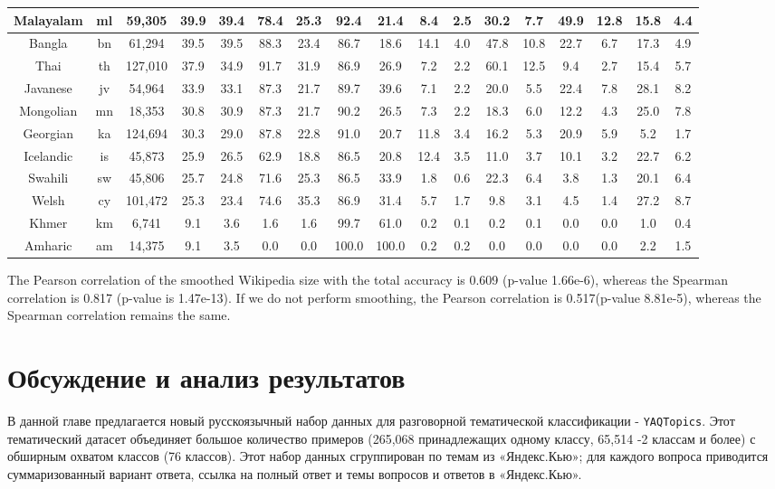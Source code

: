 \begin{table*}
{\begin{tabular}{|c|c|c||c|c|c|c|c|c|c|c|c|c|c|c|c|c|}
Malayalam & ml & 59,305 & 39.9 & 39.4 & 78.4 & 25.3 & 92.4 & 21.4 & 8.4 & 2.5 & 30.2 & 7.7 & 49.9 & 12.8 & 15.8 & 4.4\\ \hline
Bangla & bn & 61,294 & 39.5 & 39.5 & 88.3 & 23.4 & 86.7 & 18.6 & 14.1 & 4.0 & 47.8 & 10.8 & 22.7 & 6.7 & 17.3 & 4.9\\ \hline
Thai & th & 127,010 & 37.9 & 34.9 & 91.7 & 31.9 & 86.9 & 26.9 & 7.2 & 2.2 & 60.1 & 12.5 & 9.4 & 2.7 & 15.4 & 5.7\\ \hline
Javanese & jv & 54,964 & 33.9 & 33.1 & 87.3 & 21.7 & 89.7 & 39.6 & 7.1 & 2.2 & 20.0 & 5.5 & 22.4 & 7.8 & 28.1 & 8.2\\ \hline
Mongolian & mn & 18,353 & 30.8 & 30.9 & 87.3 & 21.7 & 90.2 & 26.5 & 7.3 & 2.2 & 18.3 & 6.0 & 12.2 & 4.3 & 25.0 & 7.8\\ \hline
Georgian & ka & 124,694 & 30.3 & 29.0 & 87.8 & 22.8 & 91.0 & 20.7 & 11.8 & 3.4 & 16.2 & 5.3 & 20.9 & 5.9 & 5.2 & 1.7\\ \hline
Icelandic & is & 45,873 & 25.9 & 26.5 & 62.9 & 18.8 & 86.5 & 20.8 & 12.4 & 3.5 & 11.0 & 3.7 & 10.1 & 3.2 & 22.7 & 6.2\\ \hline
Swahili & sw & 45,806 & 25.7 & 24.8 & 71.6 & 25.3 & 86.5 & 33.9 & 1.8 & 0.6 & 22.3 & 6.4 & 3.8 & 1.3 & 20.1 & 6.4\\ \hline
Welsh & cy & 101,472 & 25.3 & 23.4 & 74.6 & 35.3 & 86.9 & 31.4 & 5.7 & 1.7 & 9.8 & 3.1 & 4.5 & 1.4 & 27.2 & 8.7\\ \hline
Khmer & km & 6,741 & 9.1 & 3.6 & 1.6 & 1.6 & 99.7 & 61.0 & 0.2 & 0.1 & 0.2 & 0.1 & 0.0 & 0.0 & 1.0 & 0.4\\ \hline
Amharic & am & 14,375 & 9.1 & 3.5 & 0.0 & 0.0 & 100.0 & 100.0 & 0.2 & 0.2 & 0.0 & 0.0 & 0.0 & 0.0 & 2.2 & 1.5\\ \hline
\end{tabular}
}
\end{table*}
The Pearson correlation of the smoothed Wikipedia size with the total accuracy is 0.609 (p-value 1.66e-6), whereas the Spearman correlation is 0.817 (p-value is 1.47e-13). If we do not perform smoothing, the Pearson correlation is 0.517(p-value 8.81e-5), whereas the Spearman correlation remains the same.

\section{Обсуждение и анализ результатов} 

В данной главе предлагается новый русскоязычный набор данных для разговорной тематической классификации - \texttt{YAQTopics}. Этот тематический датасет объединяет большое количество примеров (265,068 принадлежащих одному классу, 65,514 -2 классам и более) с обширным охватом классов (76 классов). Этот набор данных сгруппирован по темам из «Яндекс.Кью»; для каждого вопроса приводится суммаризованный вариант ответа, ссылка на полный ответ и темы вопросов и ответов в «Яндекс.Кью».

